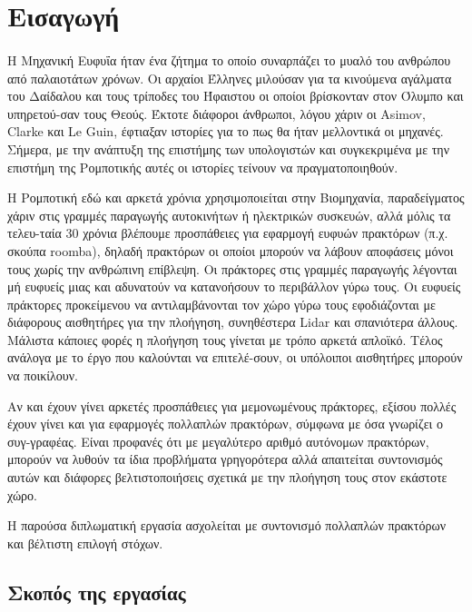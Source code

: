 \section{Εισαγωγή}
\paragraph{}Η Μηχανική Ευφυΐα ήταν ένα ζήτημα το οποίο συναρπάζει το μυαλό του ανθρώπου από παλαιοτάτων χρόνων. Οι αρχαίοι Έλληνες μιλούσαν για τα κινούμενα αγάλματα του Δαίδαλου και τους τρίποδες του Ήφαιστου οι οποίοι βρίσκονταν στον Όλυμπο και υπηρετού-σαν τους Θεούς. Έκτοτε διάφοροι άνθρωποι, λόγου χάριν  οι Asimov, Clarke και Le Guin, έφτιαξαν ιστορίες για το πως θα ήταν μελλοντικά οι μηχανές. Σήμερα, με την ανάπτυξη της επιστήμης των υπολογιστών και συγκεκριμένα με την επιστήμη της Ρομποτικής αυτές οι ιστορίες τείνουν να πραγματοποιηθούν. 

Η Ρομποτική εδώ και αρκετά χρόνια χρησιμοποιείται στην Βιομηχανία, παραδείγματος χάριν στις γραμμές παραγωγής αυτοκινήτων ή ηλεκτρικών συσκευών, αλλά μόλις τα τελευ-ταία 30 χρόνια βλέπουμε προσπάθειες για εφαρμογή ευφυών πρακτόρων (π.χ. σκούπα roomba), δηλαδή πρακτόρων οι οποίοι μπορούν να λάβουν αποφάσεις μόνοι τους χωρίς την ανθρώπινη επίβλεψη. Οι πράκτορες στις γραμμές παραγωγής λέγονται μή ευφυείς μιας και αδυνατούν να κατανοήσουν το περιβάλλον γύρω τους. Οι ευφυείς πράκτορες προκείμενου να αντιλαμβάνονται τον χώρο γύρω τους εφοδιάζονται με διάφορους αισθητήρες για την πλοήγηση, συνηθέστερα Lidar και σπανιότερα άλλους. Μάλιστα κάποιες φορές η πλοήγηση τους γίνεται με τρόπο αρκετά απλοϊκό. Τέλος ανάλογα με το έργο που καλούνται να επιτελέ-σουν, οι υπόλοιποι αισθητήρες μπορούν να ποικίλουν. 

Αν και έχουν γίνει αρκετές προσπάθειες για μεμονωμένους πράκτορες, εξίσου πολλές έχουν γίνει και για εφαρμογές πολλαπλών πρακτόρων, σύμφωνα με όσα γνωρίζει ο συγ-γραφέας. Είναι προφανές ότι με μεγαλύτερο αριθμό αυτόνομων πρακτόρων, μπορούν να λυθούν τα ίδια προβλήματα γρηγορότερα αλλά απαιτείται συντονισμός αυτών και διάφορες βελτιστοποιήσεις σχετικά με την πλοήγηση τους στον εκάστοτε χώρο.

Η παρούσα διπλωματική εργασία ασχολείται με συντονισμό πολλαπλών πρακτόρων και βέλτιστη επιλογή στόχων.  

\subsection{Σκοπός της εργασίας}

